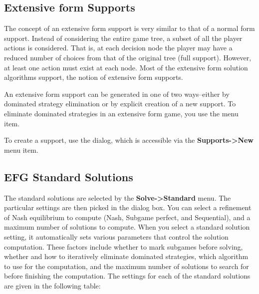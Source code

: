 \documentclass[12pt]{report}
\begin{document}
\subsection{Extensive form Supports}
The concept of an extensive form support is very similar to that of a
normal form support.  Instead of considering the entire game tree, a
subset of all the player actions is considered.  That is, at each
decision node the player may have a reduced number of choices from
that of the original tree (full support).  However, at least one
action must exist at each node.  Most of the extensive form solution
algorithms support, the notion of extensive form supports.

An extensive form support can be generated in one of two ways--either by 
dominated strategy elimination or by explicit creation of a new support.  
To eliminate dominated strategies in an extensive form game, you use the 
 menu item.  

To create a support, use the  
dialog, which is accessible via the {\bf Supports->New} menu item.


\subsection{EFG Standard Solutions}\label{EFGStandardSolutions}
The standard solutions are selected by the {\bf Solve->Standard} menu.
The particular settings are then picked in the dialog box.  You can
select a refinement of Nash equilibrium to compute (Nash, Subgame
perfect, and Sequential), and a maximum number of solutions to
compute.  When you select a standard solution setting, it
automatically sets various parameters that control the solution
computation.  These factors include whether to mark subgames before
solving, whether and how to iteratively eliminate dominated
strategies, which algorithm to use for the computation, and the
maximum number of solutions to search for before finishing the
computation.  The settings for each of the standard solutions are
given in the following table:
\end{document}
